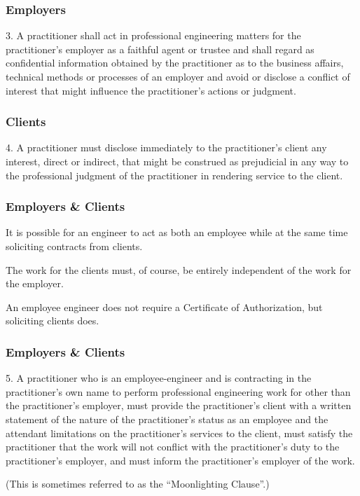 \begin{frame}
\frametitle{Employers}

3. A practitioner shall act in professional engineering matters for the practitioner's employer as a faithful agent or trustee and shall regard as confidential information obtained by the practitioner as to the business affairs, technical methods or processes of an employer and avoid or disclose a conflict of interest that might influence the practitioner's actions or judgment.


\end{frame}



\begin{frame}
\frametitle{Clients}

4. A practitioner must disclose immediately to the practitioner's client any interest, direct or indirect, that might be construed as prejudicial in any way to the professional judgment of the practitioner in rendering service to the client.

\end{frame}



\begin{frame}
\frametitle{Employers \& Clients}

It is possible for an engineer to act as both an employee while at the same time soliciting contracts from clients.


The work for the clients must, of course, be entirely independent of the work for the employer.

An employee engineer does not require a Certificate of Authorization, but soliciting clients does.

\end{frame}



\begin{frame}
\frametitle{Employers \& Clients}

5. A practitioner who is an employee-engineer and is contracting in the practitioner's own name to perform professional engineering work for other than the practitioner's employer, must provide the practitioner's client with a written statement of the nature of the practitioner's status as an employee and the attendant limitations on the practitioner's services to the client, must satisfy the practitioner that the work will not conflict with the practitioner's duty to the practitioner's employer, and must inform the practitioner's employer of the work.


(This is sometimes referred to as the ``Moonlighting Clause''.)

\end{frame}




